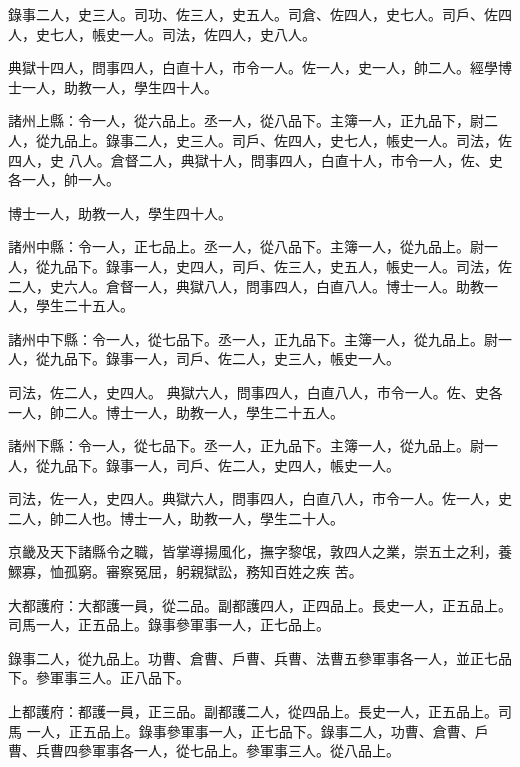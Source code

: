 \begin{pinyinscope}
 錄事二人，史三人。司功、佐三人，史五人。司倉、佐四人，史七人。司戶、佐四人，史七人，帳史一人。司法，佐四人，史八人。



 典獄十四人，問事四人，白直十人，市令一人。佐一人，史一人，帥二人。經學博士一人，助教一人，學生四十人。



 諸州上縣：令一人，從六品上。丞一人，從八品下。主簿一人，正九品下，尉二人，從九品上。錄事二人，史三人。司戶、佐四人，史七人，帳史一人。司法，佐四人，史
 八人。倉督二人，典獄十人，問事四人，白直十人，市令一人，佐、史各一人，帥一人。



 博士一人，助教一人，學生四十人。



 諸州中縣：令一人，正七品上。丞一人，從八品下。主簿一人，從九品上。尉一人，從九品下。錄事一人，史四人，司戶、佐三人，史五人，帳史一人。司法，佐二人，史六人。倉督一人，典獄八人，問事四人，白直八人。博士一人。助教一人，學生二十五人。



 諸州中下縣：令一人，從七品下。丞一人，正九品下。主簿一人，從九品上。尉一人，從九品下。錄事一人，司戶、佐二人，史三人，帳史一人。



 司法，佐二人，史四人。
 典獄六人，問事四人，白直八人，市令一人。佐、史各一人，帥二人。博士一人，助教一人，學生二十五人。



 諸州下縣：令一人，從七品下。丞一人，正九品下。主簿一人，從九品上。尉一人，從九品下。錄事一人，司戶、佐二人，史四人，帳史一人。



 司法，佐一人，史四人。典獄六人，問事四人，白直八人，市令一人。佐一人，史二人，帥二人也。博士一人，助教一人，學生二十人。



 京畿及天下諸縣令之職，皆掌導揚風化，撫字黎氓，敦四人之業，崇五土之利，養鰥寡，恤孤窮。審察冤屈，躬親獄訟，務知百姓之疾
 苦。



 大都護府：大都護一員，從二品。副都護四人，正四品上。長史一人，正五品上。司馬一人，正五品上。錄事參軍事一人，正七品上。



 錄事二人，從九品上。功曹、倉曹、戶曹、兵曹、法曹五參軍事各一人，並正七品下。參軍事三人。正八品下。



 上都護府：都護一員，正三品。副都護二人，從四品上。長史一人，正五品上。司馬
 一人，正五品上。錄事參軍事一人，正七品下。錄事二人，功曹、倉曹、戶曹、兵曹四參軍事各一人，從七品上。參軍事三人。從八品上。




\end{pinyinscope}
